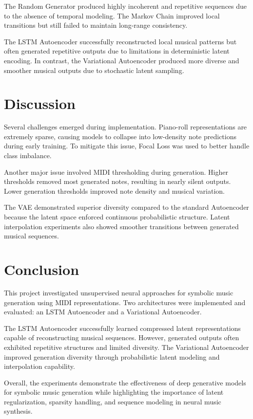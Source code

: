 \documentclass[conference]{IEEEtran}
\begin{document}
The Random Generator produced highly incoherent and repetitive sequences due to the absence of temporal modeling. The Markov Chain improved local transitions but still failed to maintain long-range consistency.

The LSTM Autoencoder successfully reconstructed local musical patterns but often generated repetitive outputs due to limitations in deterministic latent encoding. In contrast, the Variational Autoencoder produced more diverse and smoother musical outputs due to stochastic latent sampling.

\section{Discussion}
Several challenges emerged during implementation. Piano-roll representations are extremely sparse, causing models to collapse into low-density note predictions during early training. To mitigate this issue, Focal Loss was used to better handle class imbalance.

Another major issue involved MIDI thresholding during generation. Higher thresholds removed most generated notes, resulting in nearly silent outputs. Lower generation thresholds improved note density and musical variation.

The VAE demonstrated superior diversity compared to the standard Autoencoder because the latent space enforced continuous probabilistic structure. Latent interpolation experiments also showed smoother transitions between generated musical sequences.

\section{Conclusion}
This project investigated unsupervised neural approaches for symbolic music generation using MIDI representations. Two architectures were implemented and evaluated: an LSTM Autoencoder and a Variational Autoencoder.

The LSTM Autoencoder successfully learned compressed latent representations capable of reconstructing musical sequences. However, generated outputs often exhibited repetitive structures and limited diversity. The Variational Autoencoder improved generation diversity through probabilistic latent modeling and interpolation capability.

Overall, the experiments demonstrate the effectiveness of deep generative models for symbolic music generation while highlighting the importance of latent regularization, sparsity handling, and sequence modeling in neural music synthesis.
\end{document}
